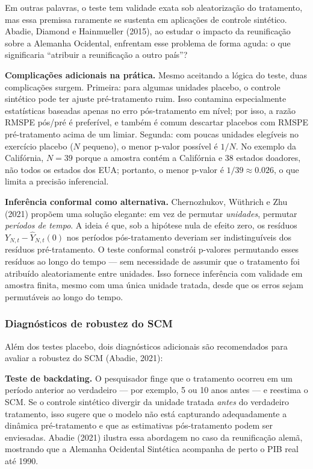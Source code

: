\documentclass[
]{article}
\begin{document}
Em outras palavras, o teste tem validade exata sob aleatorização do tratamento, mas essa premissa raramente se sustenta em aplicações de controle sintético. Abadie, Diamond e Hainmueller (2015), ao estudar o impacto da reunificação sobre a Alemanha Ocidental, enfrentam esse problema de forma aguda: o que significaria ``atribuir a reunificação a outro país''?

\textbf{Complicações adicionais na prática.} Mesmo aceitando a lógica do teste, duas complicações surgem. Primeira: para algumas unidades placebo, o controle sintético pode ter ajuste pré-tratamento ruim. Isso contamina especialmente estatísticas baseadas apenas no erro pós-tratamento em nível; por isso, a razão RMSPE pós/pré é preferível, e também é comum descartar placebos com RMSPE pré-tratamento acima de um limiar. Segunda: com poucas unidades elegíveis no exercício placebo (\(N\) pequeno), o menor p-valor possível é \(1/N\). No exemplo da Califórnia, \(N = 39\) porque a amostra contém a Califórnia e 38 estados doadores, não todos os estados dos EUA; portanto, o menor p-valor é \(1/39 \approx 0.026\), o que limita a precisão inferencial.

\textbf{Inferência conformal como alternativa.} Chernozhukov, Wüthrich e Zhu (2021) propõem uma solução elegante: em vez de permutar \emph{unidades}, permutar \emph{períodos de tempo}. A ideia é que, sob a hipótese nula de efeito zero, os resíduos \(Y_{N,t} - \hat{Y}_{N,t}(0)\) nos períodos pós-tratamento deveriam ser indistinguíveis dos resíduos pré-tratamento. O teste conformal constrói p-valores permutando esses resíduos ao longo do tempo --- sem necessidade de assumir que o tratamento foi atribuído aleatoriamente entre unidades. Isso fornece inferência com validade em amostra finita, mesmo com uma única unidade tratada, desde que os erros sejam permutáveis ao longo do tempo.

\subsubsection{Diagnósticos de robustez do SCM}\label{diagnuxf3sticos-de-robustez-do-scm}

Além dos testes placebo, dois diagnósticos adicionais são recomendados para avaliar a robustez do SCM (Abadie, 2021):

\textbf{Teste de backdating.} O pesquisador finge que o tratamento ocorreu em um período anterior ao verdadeiro --- por exemplo, 5 ou 10 anos antes --- e reestima o SCM. Se o controle sintético divergir da unidade tratada \emph{antes} do verdadeiro tratamento, isso sugere que o modelo não está capturando adequadamente a dinâmica pré-tratamento e que as estimativas pós-tratamento podem ser enviesadas. Abadie (2021) ilustra essa abordagem no caso da reunificação alemã, mostrando que a Alemanha Ocidental Sintética acompanha de perto o PIB real até 1990.
\end{document}
